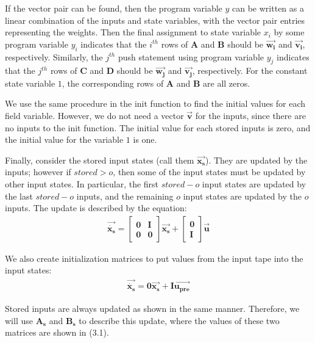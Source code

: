    If the vector pair can be found, then the program variable $y$ can
be written as a linear combination of the inputs and state
variables, with the vector pair entries representing the weights.
Then the final assignment to state variable $x_i$ by some program
variable $y_i$ indicates that the $i^{th}$ rows of $\mathbf{A}$
and $\mathbf{B}$ should be $\vec{\mathbf{w_i}}$ and
$\vec{\mathbf{v_i}}$, respectively. Similarly, the $j^{th}$ push
statement using program variable $y_j$ indicates that the $j^{th}$
rows of $\mathbf{C}$ and $\mathbf{D}$ should be
$\vec{\mathbf{w_j}}$ and $\vec{\mathbf{v_j}}$, respectively. For
the constant state variable $1$, the corresponding rows of
$\mathbf{A}$ and $\mathbf{B}$ are all zeros.

    We use the same procedure in the init function to find the initial
values for each field variable. However, we do not need a vector
$\vec{\mathbf{v}}$ for the inputs, since there are no inputs to
the init function. The initial value for each stored inputs is
zero, and the initial value for the variable $1$ is one.

    Finally, consider the stored input states (call them
$\vec{\mathbf{x_s}}$). They are updated by the inputs; however if
$stored > o$, then some of the input states must be updated by
other input states. In particular, the first $stored-o$ input
states are updated by the last $stored-o$ inputs, and the
remaining $o$ input states are updated by the $o$ inputs. The
update is described by the equation:
\begin{eqnarray}
\vec{\dot{\mathbf{x_s}}} = \left [
\begin{array} {cc} \mathbf{0} & \mathbf{I} \\ \mathbf{0} &
\mathbf{0} \end{array} \right ] \vec{\mathbf{x_s}} + \left [
\begin{array} {c} \mathbf{0} \\ \mathbf{I} \end{array} \right ]
\vec{\mathbf{u}}
\end{eqnarray}

    We also create initialization matrices to put values from the
input tape into the input states:
\begin{eqnarray*}
\vec{\dot{\mathbf{x_s}}} = \mathbf{0} \vec{\mathbf{x_s}} +
\mathbf{I} \vec{\mathbf{u_{pre}}}
\end{eqnarray*}

    Stored inputs are always updated as shown in the same manner.
Therefore, we will use $\mathbf{A_s}$ and $\mathbf{B_s}$ to
describe this update, where the values of these two matrices are
shown in (3.1).

